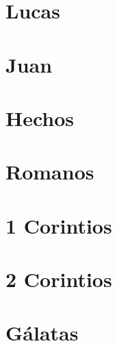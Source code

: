 \chapter{Lucas}
\begin{multicols}{2}
  \raggedcolumns
  \parskip=0pt \relax
  
\end{multicols}

\chapter{Juan}
\begin{multicols}{2}
  \raggedcolumns
  \parskip=0pt \relax
  
\end{multicols}

\chapter{Hechos}
\begin{multicols}{2}
  \raggedcolumns
  \parskip=0pt \relax
  
\end{multicols}

\chapter{Romanos}
\begin{multicols}{2}
  \raggedcolumns
  \parskip=0pt \relax
  
\end{multicols}

\chapter{1 Corintios}
\begin{multicols}{2}
  \raggedcolumns
  \parskip=0pt \relax
  
\end{multicols}

\chapter{2 Corintios}
\begin{multicols}{2}
  \raggedcolumns
  \parskip=0pt \relax
  
\end{multicols}

\chapter{Gálatas}
\begin{multicols}{2}
  \raggedcolumns
  \parskip=0pt \relax
  
\end{multicols}

